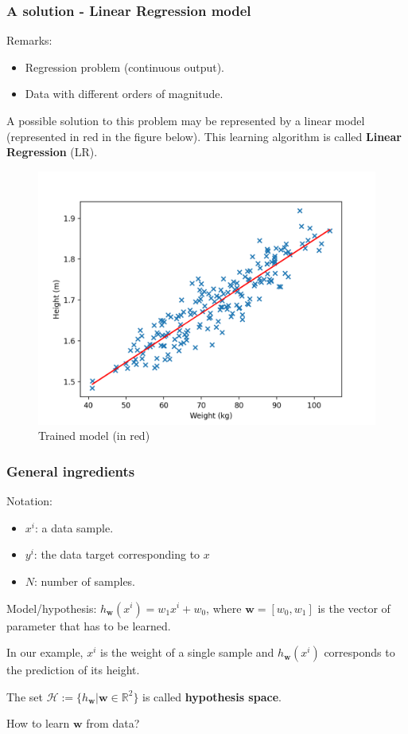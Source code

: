 \documentclass{beamer}
\begin{document}
	\begin{frame}
		\frametitle{A solution - Linear Regression model}
		Remarks:
		\begin{itemize}
			\item Regression problem (continuous output).
			\item Data with different orders of magnitude.
		\end{itemize}
		A possible solution to this problem may be represented by a linear model (represented in red in the figure below). This learning algorithm is called \textbf{Linear Regression} (LR).
		\begin{figure}
			\centering
			\includegraphics[scale=0.4]{images/linear_regression_fit}
			\caption{Trained model (in red)}
		\end{figure}
	\end{frame}

	\begin{frame}
		\frametitle{General ingredients}
		Notation:
		\begin{itemize}
			\item $x^i$: a data sample.
			\item $y^i$: the data target corresponding to $x$
			\item $N$: number of samples.
		\end{itemize}
	
		\vspace{5 mm}
		
		Model/hypothesis: $h_{\bm{w}}(x^i) = w_1x^i + w_0$, where $\bm{w} = [w_0, w_1]$ is the vector of parameter that has to be learned.
		
		In our example, $x^i$ is the weight of a single sample and $h_{\bm{w}}(x^i)$ corresponds to the prediction of its height. 
		
		\vspace{5 mm}
		
		The set $\mathcal{H}:= \{h_{\bm{w}}| \bm{w} \in \mathbb{R}^2\}$ is called \textbf{hypothesis space}.
		
		\vspace{5 mm}
		
		How to learn $\bm{w}$ from data?
		
	\end{frame}
\end{document}
